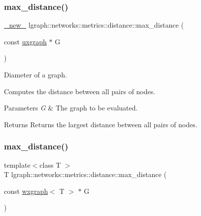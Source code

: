 \subsubsection{\texorpdfstring{max\+\_\+distance()}{max\_distance()}\hspace{0.1cm}{\footnotesize\ttfamily [1/4]}}
{\footnotesize\ttfamily \hyperlink{namespacelgraph_a2836f966c1c36b43da337d8907728ec0}{\+\_\+new\+\_\+} lgraph\+::networks\+::metrics\+::distance\+::max\+\_\+distance (\begin{DoxyParamCaption}\item[{const \hyperlink{classlgraph_1_1uxgraph}{uxgraph} $\ast$}]{G }\end{DoxyParamCaption})}



Diameter of a graph. 

Computes the distance between all pairs of nodes.


\begin{DoxyParams}{Parameters}
{\em G} & The graph to be evaluated. \\
\hline
\end{DoxyParams}
\begin{DoxyReturn}{Returns}
Returns the largest distance between all pairs of nodes. 
\end{DoxyReturn}
\mbox{\label{namespacelgraph_1_1networks_1_1metrics_1_1distance_ab497d212293a672c1b511f3e9224603d}} 
\subsubsection{\texorpdfstring{max\+\_\+distance()}{max\_distance()}\hspace{0.1cm}{\footnotesize\ttfamily [2/4]}}
{\footnotesize\ttfamily template$<$class T $>$ \\
T lgraph\+::networks\+::metrics\+::distance\+::max\+\_\+distance (\begin{DoxyParamCaption}\item[{const \hyperlink{classlgraph_1_1wxgraph}{wxgraph}$<$ T $>$ $\ast$}]{G }\end{DoxyParamCaption})}



